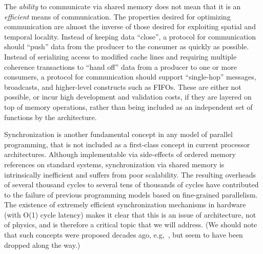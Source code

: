 The \textit{ability} to communicate via shared memory does not mean
that it is an \textit{efficient} means of communication.  The
properties desired for optimizing communication are almost the inverse
of those desired for exploiting spatial and temporal locality.
Instead of keeping data ``close'', a protocol for communication should
``push'' data from the producer to the consumer as quickly as
possible.  Instead of serializing access to modified cache lines and
requiring multiple coherence transactions to ``hand off'' data from a
producer to one or more consumers, a protocol for communication should
support ``single-hop'' messages, broadcasts, and higher-level
constructs such as FIFOs.  These are either not possible, or incur
high development and validation costs, if they are layered on top of
memory operations, rather than being included as an independent set of
functions by the architecture.

 Synchronization is another fundamental
concept in any model of parallel programming, that is not included as
a first-class concept in current processor architectures.  Although
implementable via side-effects of ordered memory references on
standard systems, synchronization via shared memory is intrinsically
inefficient and suffers from poor scalability.  The resulting
overheads of several thousand cycles to several tens of thousands of
cycles have contributed to the failure of previous programming models
based on fine-grained parallelism.  The existence of extremely
efficient synchronization mechanisms in hardware (with O(1) cycle
latency) makes it clear that this is an issue of architecture, not of
physics, and is therefore a critical topic that we will address.  (We
should note that such concepts were proposed decades ago,
e.g,~\cite{Dally:1992:MDP}, but seem to have been dropped along the
way.)


\begin{comment}
On the other hand, extremely fine-grained synchronization mechanisms
exists as part of the processor, for instance to handle 
out-of-order scheduling of instructions. Work by Dally~\cite{Dally:1992:MDP}
showed that processors can be built that offer synchronization primitives
on user level with a single-digit cycle overhead.

(We note that NVidia GPUs are based on lightweight threads. However, these
are of a homogeneous, almost SIMD, nature. The also don't feature the 
dataflow dependencies between single threads that we argue for and that 
our programming model generates. Thus, we argue for adapting CPU design,
rather than adopting GPU features.)
\end{comment}

